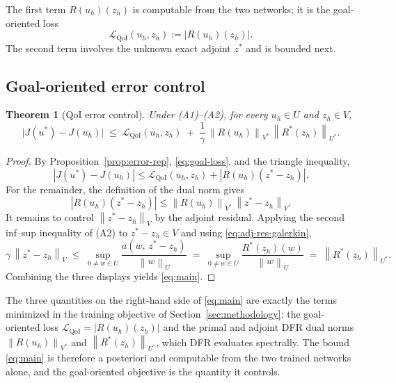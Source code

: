 \documentclass[preprint,11pt]{elsarticle}
\newtheorem{theorem}{Theorem}[section]
\newcommand{\norm}[1]{\left\|#1\right\|}
\begin{document}
The first term $R(u_h)(z_h)$ is computable from the two networks; it is the goal-oriented loss
\begin{equation}
  \label{eq:goal-loss}
  \mathcal{L}_{\mathrm{QoI}}(u_h, z_h) := |R(u_h)(z_h)|.
\end{equation}
The second term involves the unknown exact adjoint $z^*$ and is bounded next.

\subsection{Goal-oriented error control}

\begin{theorem}[QoI error control]
\label{thm:main}
Under (A1)--(A2), for every $u_h \in U$ and $z_h \in V$,
\begin{equation}
  \label{eq:main}
  \bigl| J(u^*) - J(u_h) \bigr|
  \;\leq\;
  \mathcal{L}_{\mathrm{QoI}}(u_h, z_h)
  \;+\;
  \frac{1}{\gamma}\,\norm{R(u_h)}_{V^*}\,\norm{R^*(z_h)}_{U^*}.
\end{equation}
\end{theorem}

\begin{proof}
By Proposition~\ref{prop:error-rep}, \eqref{eq:goal-loss}, and the triangle inequality,
\begin{equation*}
  |J(u^*) - J(u_h)| \leq \mathcal{L}_{\mathrm{QoI}}(u_h, z_h) + |R(u_h)(z^* - z_h)| .
\end{equation*}
For the remainder, the definition of the dual norm gives
\begin{equation*}
  |R(u_h)(z^* - z_h)| \leq \norm{R(u_h)}_{V^*}\,\norm{z^* - z_h}_V .
\end{equation*}
It remains to control $\norm{z^* - z_h}_V$ by the adjoint residual. Applying the second inf--sup inequality of (A2) to $z^* - z_h \in V$ and using \eqref{eq:adj-res-galerkin},
\begin{equation*}
  \gamma\,\norm{z^* - z_h}_V
  \;\leq\; \sup_{0 \neq w \in U} \frac{a(w,\, z^* - z_h)}{\norm{w}_U}
  \;=\; \sup_{0 \neq w \in U} \frac{R^*(z_h)(w)}{\norm{w}_U}
  \;=\; \norm{R^*(z_h)}_{U^*} .
\end{equation*}
Combining the three displays yields \eqref{eq:main}.
\end{proof}

The three quantities on the right-hand side of \eqref{eq:main} are exactly the terms minimized in the training objective of Section~\ref{sec:methodology}: the goal-oriented loss $\mathcal{L}_{\mathrm{QoI}} = |R(u_h)(z_h)|$ and the primal and adjoint DFR dual norms $\norm{R(u_h)}_{V^*}$ and $\norm{R^*(z_h)}_{U^*}$, which DFR evaluates spectrally. The bound \eqref{eq:main} is therefore a posteriori and computable from the two trained networks alone, and the goal-oriented objective is the quantity it controls.
\end{document}

